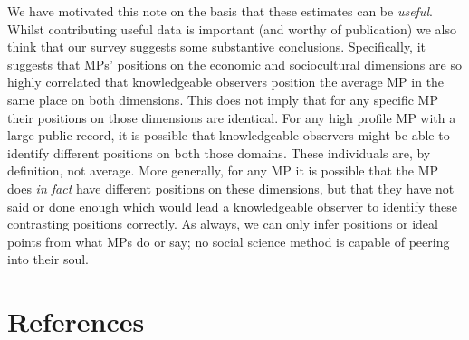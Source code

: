 \documentclass[
]{article}
\begin{document}
We have motivated this note on the basis that these estimates can be
\emph{useful}. Whilst contributing useful data is important (and worthy
of publication) we also think that our survey suggests some substantive
conclusions. Specifically, it suggests that MPs' positions on the
economic and sociocultural dimensions are so highly correlated that
knowledgeable observers position the average MP in the same place on
both dimensions. This does not imply that for any specific MP their
positions on those dimensions are identical. For any high profile MP
with a large public record, it is possible that knowledgeable observers
might be able to identify different positions on both those domains.
These individuals are, by definition, not average. More generally, for
any MP it is possible that the MP does \emph{in fact} have different
positions on these dimensions, but that they have not said or done
enough which would lead a knowledgeable observer to identify these
contrasting positions correctly. As always, we can only infer positions
or ideal points from what MPs do or say; no social science method is
capable of peering into their soul.

\section*{References}\label{references}
\end{document}
